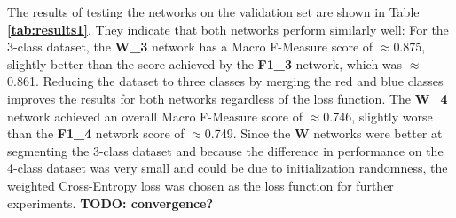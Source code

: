 \noindent The results of testing the networks on the validation set are shown in Table \textbf{\ref{tab:results1}}. They indicate that both networks perform similarly well: For the 3-class dataset, the \textbf{W\_3} network has a Macro F-Measure score of $\approx$0.875, slightly better than the score achieved by the \textbf{F1\_3} network, which was $\approx$0.861. Reducing the dataset to three classes by merging the red and blue classes improves the results for both networks regardless of the loss function. The \textbf{W\_4} network achieved an overall Macro F-Measure score of $\approx$0.746, slightly worse than the \textbf{F1\_4} network score of $\approx$0.749. Since the \textbf{W} networks were better at segmenting the 3-class dataset and because the difference in performance on the 4-class dataset was very small and could be due to initialization randomness, the weighted Cross-Entropy loss was chosen as the loss function for further experiments. \textbf{TODO: convergence?}\\


